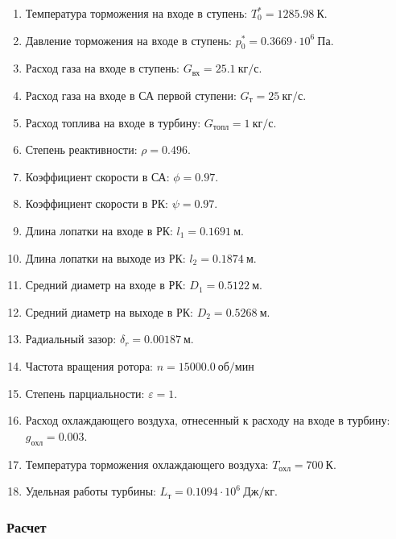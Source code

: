 \documentclass[a4paper,10pt]{article}
\begin{document}
    
    \begin{enumerate}

        \item Температура торможения на входе в ступень: $T_0^* = 1285.98\ К $.
        \item Давление торможения на входе в ступень: $p_0^* = 0.3669 \cdot 10^6 \ Па$.
        \item Расход газа на входе в ступень: $G_{вх} = 25.1\ кг/с$.
        \item Расход газа на входе в СА первой ступени: $ G_т = 25\ кг/с $.
        \item Расход топлива на входе в турбину: $ G_{топл} = 1\ кг/с $.
        \item Степень реактивности: $ \rho = 0.496 $.
        \item Коэффициент скорости в СА: $ \phi = 0.97 $.
        \item Коэффициент скорости в РК: $ \psi = 0.97 $.
        \item Длина лопатки на входе в РК: $ l_1 = 0.1691\ м $.
        \item Длина лопатки на выходе из РК: $ l_2 = 0.1874\ м $.
        \item Средний диаметр на входе в РК: $ D_1 = 0.5122\ м $.
        \item Средний диаметр на выходе в РК: $ D_2 = 0.5268\ м $.
        \item Радиальный зазор: $ \delta_r = 0.00187\ м $.
        \item Частота вращения ротора: $ n = 15000.0\ об/мин $
        \item Степень парциальности: $ \varepsilon = 1 $.
        \item Расход охлаждающего воздуха, отнесенный к расходу на входе в турбину: $ g_{охл} = 0.003 $.
        \item Температура торможения охлаждающего воздуха: $ T_{охл} = 700\ К $.

        
        \item Удельная работы турбины: $ L_т = 0.1094 \cdot 10^6 \ Дж/кг $.

        

    \end{enumerate}
    

    \subsubsection{Расчет}

    
\end{document}

